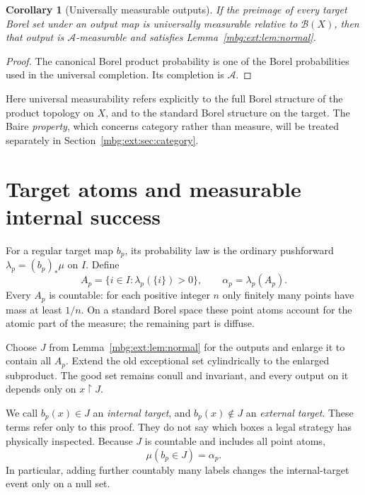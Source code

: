 \documentclass[11pt,letterpaper]{article}
\newtheorem{corollary}[theorem]{Corollary}
\theoremstyle{definition}
\newcommand{\restr}{\mathbin{\upharpoonright}}
\newcommand{\A}{\mathcal A}
\newcommand{\B}{\mathcal B}
\begin{document}
\begin{corollary}[Universally measurable outputs]
\label{mbg:ext:cor:universal}
If the preimage of every target Borel set under an output map is universally measurable relative to $\B(X)$, then that output is $\A$-measurable and satisfies Lemma~\ref{mbg:ext:lem:normal}.
\end{corollary}
\begin{proof}
The canonical Borel product probability is one of the Borel probabilities used in the universal completion. Its completion is $\A$.
\end{proof}

Here universal measurability refers explicitly to the full Borel structure of the product topology on $X$, and to the standard Borel structure on the target. The Baire \emph{property}, which concerns category rather than measure, will be treated separately in Section~\ref{mbg:ext:sec:category}.

\section{Target atoms and measurable internal success}
\label{mbg:ext:sec:atoms}

For a regular target map $b_p$, its probability law is the ordinary pushforward $\lambda_p=(b_p)_*\mu$ on $I$. Define
\[
A_p=\{i\in I:\lambda_p(\{i\})>0\},\qquad
\alpha_p=\lambda_p(A_p).
\]
Every $A_p$ is countable: for each positive integer $n$ only finitely many points have mass at least $1/n$. On a standard Borel space these point atoms account for the atomic part of the measure; the remaining part is diffuse.

Choose $J$ from Lemma~\ref{mbg:ext:lem:normal} for the outputs and enlarge it to contain all $A_p$. Extend the old exceptional set cylindrically to the enlarged subproduct. The good set remains conull and invariant, and every output on it depends only on $x\restr J$.

We call $b_p(x)\in J$ an \emph{internal target}, and $b_p(x)\notin J$ an \emph{external target}. These terms refer only to this proof. They do not say which boxes a legal strategy has physically inspected. Because $J$ is countable and includes all point atoms,
\begin{equation}
\mu(b_p\in J)=\alpha_p.
\label{mbg:ext:eq:internal-mass}
\end{equation}
In particular, adding further countably many labels changes the internal-target event only on a null set.
\end{document}
